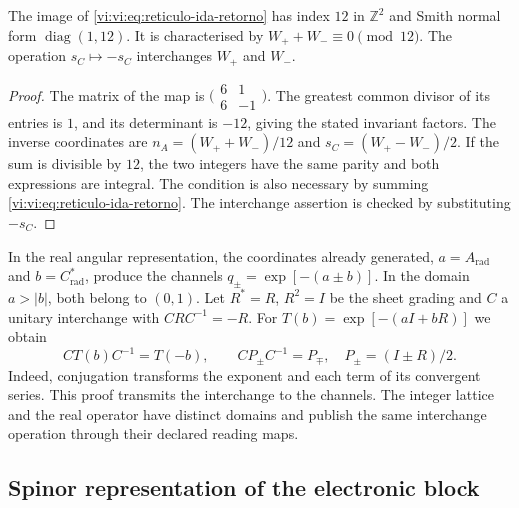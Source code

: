 \begin{proposition}
\label{vi:vi:prop:indice-bidireccional}
The image of \eqref{vi:vi:eq:reticulo-ida-retorno} has index $12$
in $\mathbb Z^2$ and Smith normal form $\operatorname{diag}(1,12)$.
It is characterised by $W_++W_-\equiv0\pmod{12}$. The operation
$s_C\mapsto-s_C$ interchanges $W_+$ and $W_-$.
\end{proposition}
\begin{proof}
The matrix of the map is
$\bigl(\begin{smallmatrix}6&1\\6&-1\end{smallmatrix}\bigr)$.
The greatest common divisor of its entries is $1$, and its determinant
is $-12$, giving the stated invariant factors. The inverse
coordinates are
$n_A=(W_++W_-)/12$ and $s_C=(W_+-W_-)/2$.
If the sum is divisible by $12$, the two integers have the same
parity and both expressions are integral. The condition is also
necessary by summing \eqref{vi:vi:eq:reticulo-ida-retorno}.
The interchange assertion is checked by substituting $-s_C$.
\end{proof}

In the real angular representation, the coordinates already generated,
$a=A_{\mathrm{rad}}$ and $b=C^*_{\mathrm{rad}}$, produce the
channels $q_\pm=\exp[-(a\pm b)]$. In the domain $a>|b|$, both
belong to $(0,1)$. Let $R^*=R$, $R^2=I$ be the sheet
grading and $C$ a unitary interchange with $CRC^{-1}=-R$.
For $T(b)=\exp[-(aI+bR)]$ we obtain
\begin{equation}
 CT(b)C^{-1}=T(-b),\qquad
 CP_\pm C^{-1}=P_\mp,\quad P_\pm=(I\pm R)/2.
 \label{vi:vi:eq:conjugacion-canales}
\end{equation}
Indeed, conjugation transforms the exponent and each term
of its convergent series. This proof transmits the interchange to
the channels. The integer lattice and the real operator have distinct
domains and publish the same interchange operation through
their declared reading maps.

\subsection{Spinor representation of the electronic block}
\label{vi:vi:subsec:spin-electron}


